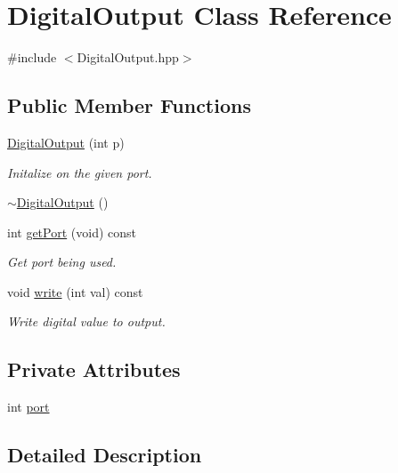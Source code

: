 \hypertarget{class_digital_output}{}\section{Digital\+Output Class Reference}
\label{class_digital_output}


{\ttfamily \#include $<$Digital\+Output.\+hpp$>$}

\subsection*{Public Member Functions}
\begin{DoxyCompactItemize}
\item 
\hyperlink{class_digital_output_a3be20f0faddd50d8f88ed0c620845dba}{Digital\+Output} (int p)
\begin{DoxyCompactList}\small\item\em Initalize on the given port. \end{DoxyCompactList}\item 
\hyperlink{class_digital_output_a442e379ebfbd2939d568809dad9c0ba2}{$\sim$\+Digital\+Output} ()
\item 
int \hyperlink{class_digital_output_a36f4869bb51da9476cf22babc07d1e40}{get\+Port} (void) const
\begin{DoxyCompactList}\small\item\em Get port being used. \end{DoxyCompactList}\item 
void \hyperlink{class_digital_output_a755a7a71484e600e45e70b61e41041b7}{write} (int val) const
\begin{DoxyCompactList}\small\item\em Write digital value to output. \end{DoxyCompactList}\end{DoxyCompactItemize}
\subsection*{Private Attributes}
\begin{DoxyCompactItemize}
\item 
int \hyperlink{class_digital_output_a01596de4b8252bd9033507e6feea1cb9}{port}
\end{DoxyCompactItemize}


\subsection{Detailed Description}


